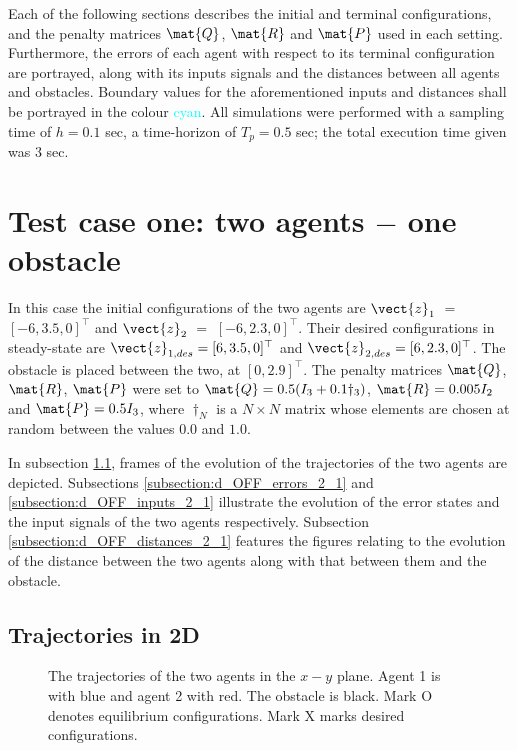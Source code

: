Each of the following sections describes the initial and terminal configurations,
and the penalty matrices $\mat{Q}$, $\mat{R}$ and $\mat{P}$ used in each setting.
Furthermore, the errors of each agent with respect to its terminal configuration
are portrayed, along with its inputs signals and the distances between all
agents and obstacles. Boundary values for the aforementioned inputs and
distances shall be portrayed in the colour \textcolor{cyan}{cyan}.
All simulations were performed with a sampling time of $h = 0.1$ sec,
a time-horizon of $T_p = 0.5$ sec; the total execution time given was $3$ sec.


\section{Test case one: two agents $-$ one obstacle}

In this case the initial configurations of the two agents are
$\vect{z}_1$ $=$ $[-6, 3.5, 0]^{\top}$ and
$\vect{z}_2$ $=$ $[-6, 2.3, 0]^{\top}$.
Their desired configurations in steady-state are
$\vect{z}_{1,des} = [6, 3.5, 0]^{\top}$ and
$\vect{z}_{2,des} = [6, 2.3, 0]^{\top}$.
The obstacle is placed between the two, at $[0, 2.9]^{\top}$. The penalty
matrices $\mat{Q}$, $\mat{R}$, $\mat{P}$ were set to
$\mat{Q} = 0.5 (I_3 + 0.1 \dagger_3)$, $\mat{R} = 0.005 I_2$ and
$\mat{P} = 0.5 I_3$, where $\dagger_N$ is a $N \times N$ matrix whose
elements are chosen at random between the values $0.0$ and $1.0$.

In subsection \ref{subsection:d_OFF_trajectories_2_1}, frames of the evolution of the
trajectories of the two agents are depicted. Subsections
\ref{subsection:d_OFF_errors_2_1} and \ref{subsection:d_OFF_inputs_2_1} illustrate
the evolution of the error states and the input signals of the two agents
respectively. Subsection \ref{subsection:d_OFF_distances_2_1} features the
figures relating to the evolution of the distance between the two agents
along with that between them and the obstacle.



\subsection{Trajectories in 2D}
\label{subsection:d_OFF_trajectories_2_1}

\begin{figure}[H]
  
  \caption{The trajectories of the two agents in the $x-y$ plane. Agent 1 is with
    blue and agent 2 with red. The obstacle is black. Mark O denotes equilibrium
    configurations. Mark X marks desired configurations.}
  \label{fig:d_OFF_trajectory_2_1}
\end{figure}


